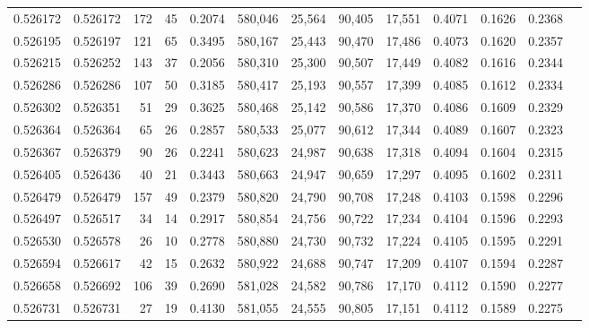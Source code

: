 \begin{tabular}{rrrrrrrrrrrrr}
0.526172 & 0.526172 &   172 &    45 &                                     0.2074 & 580,046 &  25,564 &  90,405 &  17,551 & 0.4071 & 0.1626 & 0.2368 \\
0.526195 & 0.526197 &   121 &    65 &                                     0.3495 & 580,167 &  25,443 &  90,470 &  17,486 & 0.4073 & 0.1620 & 0.2357 \\
0.526215 & 0.526252 &   143 &    37 &                                     0.2056 & 580,310 &  25,300 &  90,507 &  17,449 & 0.4082 & 0.1616 & 0.2344 \\
0.526286 & 0.526286 &   107 &    50 &                                     0.3185 & 580,417 &  25,193 &  90,557 &  17,399 & 0.4085 & 0.1612 & 0.2334 \\
0.526302 & 0.526351 &    51 &    29 &                                     0.3625 & 580,468 &  25,142 &  90,586 &  17,370 & 0.4086 & 0.1609 & 0.2329 \\
0.526364 & 0.526364 &    65 &    26 &                                     0.2857 & 580,533 &  25,077 &  90,612 &  17,344 & 0.4089 & 0.1607 & 0.2323 \\
0.526367 & 0.526379 &    90 &    26 &                                     0.2241 & 580,623 &  24,987 &  90,638 &  17,318 & 0.4094 & 0.1604 & 0.2315 \\
0.526405 & 0.526436 &    40 &    21 &                                     0.3443 & 580,663 &  24,947 &  90,659 &  17,297 & 0.4095 & 0.1602 & 0.2311 \\
0.526479 & 0.526479 &   157 &    49 &                                     0.2379 & 580,820 &  24,790 &  90,708 &  17,248 & 0.4103 & 0.1598 & 0.2296 \\
0.526497 & 0.526517 &    34 &    14 &                                     0.2917 & 580,854 &  24,756 &  90,722 &  17,234 & 0.4104 & 0.1596 & 0.2293 \\
0.526530 & 0.526578 &    26 &    10 &                                     0.2778 & 580,880 &  24,730 &  90,732 &  17,224 & 0.4105 & 0.1595 & 0.2291 \\
0.526594 & 0.526617 &    42 &    15 &                                     0.2632 & 580,922 &  24,688 &  90,747 &  17,209 & 0.4107 & 0.1594 & 0.2287 \\
0.526658 & 0.526692 &   106 &    39 &                                     0.2690 & 581,028 &  24,582 &  90,786 &  17,170 & 0.4112 & 0.1590 & 0.2277 \\
0.526731 & 0.526731 &    27 &    19 &                                     0.4130 & 581,055 &  24,555 &  90,805 &  17,151 & 0.4112 & 0.1589 & 0.2275 \\

\end{tabular}

